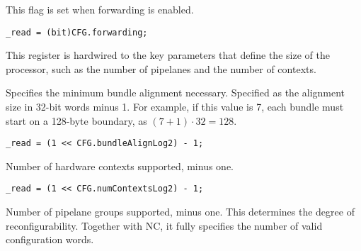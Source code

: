 This flag is set when forwarding is enabled.

\reset{*}
\implementation{}
\begin{lstlisting}
_read = (bit)CFG.forwarding;
\end{lstlisting}


This register is hardwired to the key parameters that define the size of the
processor, such as the number of pipelanes and the number of contexts.

Specifies the minimum bundle alignment necessary. Specified as the alignment
size in 32-bit words minus 1. For example, if this value is 7, each bundle must
start on a 128-byte boundary, as $(7 + 1) \cdot 32 = 128$.

\reset{****}
\implementation{}
\begin{lstlisting}
_read = (1 << CFG.bundleAlignLog2) - 1;
\end{lstlisting}

Number of hardware contexts supported, minus one.

\reset{****}
\implementation{}
\begin{lstlisting}
_read = (1 << CFG.numContextsLog2) - 1;
\end{lstlisting}

Number of pipelane groups supported, minus one. This determines the degree of
reconfigurability. Together with NC, it fully specifies the number of valid
configuration words.

